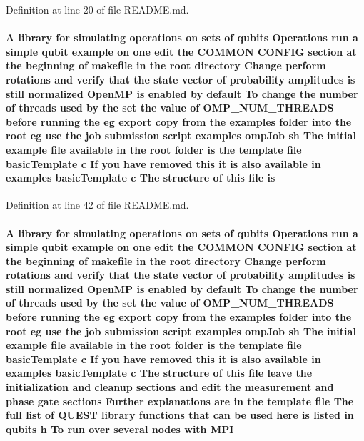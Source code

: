 Definition at line 20 of file README.md.\hypertarget{README_8md_ac361bc388656077907485b42e1531a85}{
\paragraph[{is}]{\setlength{\rightskip}{0pt plus 5cm}A library for simulating operations on sets of qubits Operations run a simple qubit example on one edit the COMMON CONFIG section at the beginning of makefile in the root directory Change perform {\bf rotations} and verify that the state vector of probability amplitudes {\bf is} still normalized OpenMP {\bf is} enabled by default To change the number of threads used by the set the value of {\bf OMP\_\-NUM\_\-THREADS} before running the {\bf eg} export copy from the examples {\bf folder} into the root {\bf eg} use the job submission script examples ompJob sh The initial example {\bf file} available in the root {\bf folder} {\bf is} the template {\bf file} basicTemplate c If you have removed this it {\bf is} also available in examples basicTemplate c The structure of this {\bf file} {\bf is}}\hfill}
\label{README_8md_ac361bc388656077907485b42e1531a85}


Definition at line 42 of file README.md.\hypertarget{README_8md_ac2feaefc780a902d0d04f9a7d5a25813}{
\paragraph[{MPI}]{\setlength{\rightskip}{0pt plus 5cm}A library for simulating operations on sets of qubits Operations run a simple qubit example on one edit the COMMON CONFIG section at the beginning of makefile in the root directory Change perform {\bf rotations} and verify that the state vector of probability amplitudes {\bf is} still normalized OpenMP {\bf is} enabled by default To change the number of threads used by the set the value of {\bf OMP\_\-NUM\_\-THREADS} before running the {\bf eg} export copy from the examples {\bf folder} into the root {\bf eg} use the job submission script examples ompJob sh The initial example {\bf file} available in the root {\bf folder} {\bf is} the template {\bf file} basicTemplate c If you have removed this it {\bf is} also available in examples basicTemplate c The structure of this {\bf file} leave the initialization and cleanup sections and edit the measurement and phase gate sections Further explanations are in the template {\bf file} The full list of QUEST library functions that can be used here {\bf is} listed in qubits h To run over several nodes with {\bf MPI}}\hfill}
\label{README_8md_ac2feaefc780a902d0d04f9a7d5a25813}


